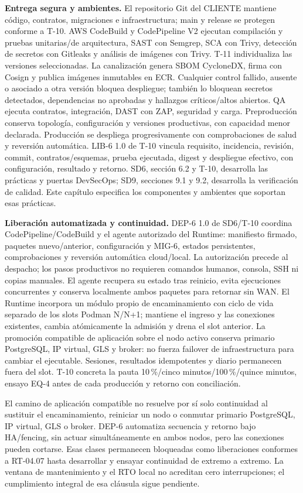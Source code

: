 \textbf{Entrega segura y ambientes.} El repositorio Git del CLIENTE mantiene código, contratos, migraciones e infraestructura; main y release se protegen conforme a T-10. AWS CodeBuild y CodePipeline V2 ejecutan compilación y pruebas unitarias/de arquitectura, SAST con Semgrep, SCA con Trivy, detección de secretos con Gitleaks y análisis de imágenes con Trivy. T-11 individualiza las versiones seleccionadas. La canalización genera SBOM CycloneDX, firma con Cosign y publica imágenes inmutables en ECR. Cualquier control fallido, ausente o asociado a otra versión bloquea despliegue; también lo bloquean secretos detectados, dependencias no aprobadas y hallazgos críticos/altos abiertos. QA ejecuta contratos, integración, DAST con ZAP, seguridad y carga. Preproducción conserva topología, configuración y versiones productivas, con capacidad menor declarada. Producción se despliega progresivamente con comprobaciones de salud y reversión automática. LIB-6 1.0 de T-10 vincula requisito, incidencia, revisión, commit, contratos/esquemas, prueba ejecutada, digest y despliegue efectivo, con configuración, resultado y retorno. SD6, sección 6.2 y T-10, desarrolla las prácticas y puertas DevSecOps; SD9, secciones 9.1 y 9.2, desarrolla la verificación de calidad. Este capítulo especifica los componentes y ambientes que soportan esas prácticas.

\textbf{Liberación automatizada y continuidad.}
DEP-6 1.0 de SD6/T-10 coordina CodePipeline/CodeBuild y el agente autorizado del Runtime: manifiesto firmado, paquetes nuevo/anterior, configuración y MIG-6, estados persistentes, comprobaciones y reversión automática cloud/local. La autorización precede al despacho; los pasos productivos no requieren comandos humanos, consola, SSH ni copias manuales. El agente recupera su estado tras reinicio, evita ejecuciones concurrentes y conserva localmente ambos paquetes para retornar sin WAN. El Runtime incorpora un módulo propio de encaminamiento con ciclo de vida separado de los slots Podman N/N+1; mantiene el ingreso y las conexiones existentes, cambia atómicamente la admisión y drena el slot anterior. La promoción compatible de aplicación sobre el nodo activo conserva primario PostgreSQL, IP virtual, GLS y broker: no fuerza failover de infraestructura para cambiar el ejecutable. Sesiones, resultados idempotentes y diario permanecen fuera del slot. T-10 concreta la pauta 10\,\%/cinco minutos/100\,\%/quince minutos, ensayo EQ-4 antes de cada producción y retorno con conciliación.

El camino de aplicación compatible no resuelve por sí solo continuidad al sustituir el encaminamiento, reiniciar un nodo o conmutar primario PostgreSQL, IP virtual, GLS o broker. DEP-6 automatiza secuencia y retorno bajo HA/fencing, sin actuar simultáneamente en ambos nodos, pero las conexiones pueden cortarse. Esas clases permanecen bloqueadas como liberaciones conformes a RT-04.07 hasta desarrollar y ensayar continuidad de extremo a extremo. La ventana de mantenimiento y el RTO local no acreditan cero interrupciones; el cumplimiento integral de esa cláusula sigue pendiente. \parencites[RT-04.06/07, p.~11]{pucv-transversal}[art.~20, pp.~14--15]{pucv-admin}

